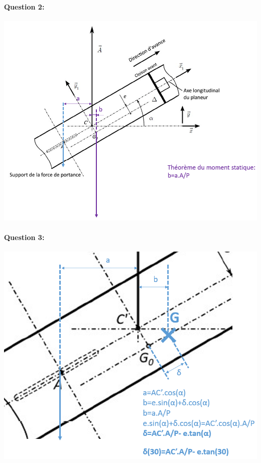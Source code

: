 \paragraph{Question 2:}

\begin{center}
	\includegraphics[width=0.8\linewidth]{img/Cor2}
\end{center}

\newpage

\paragraph{Question 3:}

\begin{center}
	\includegraphics[width=0.8\linewidth]{img/Cor3}
\end{center}

